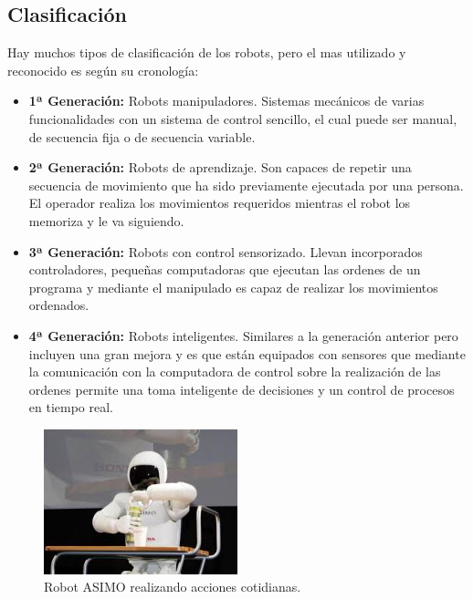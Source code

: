 \subsection{Clasificación}
\hspace{1cm} Hay muchos tipos de clasificación de los robots, pero el mas utilizado y reconocido es según su cronología:

\begin{itemize}
		\item \textbf{1ª Generación:} Robots manipuladores. Sistemas mecánicos de varias funcionalidades con un sistema de control sencillo, el cual puede ser manual, de secuencia fija o de secuencia variable.

	\item\textbf{2ª Generación:} Robots de aprendizaje. Son capaces de repetir una secuencia de movimiento que ha sido previamente ejecutada por una persona. El operador realiza los movimientos requeridos mientras el robot los memoriza y le va siguiendo. 

	\item\textbf{3ª Generación:} Robots con control sensorizado. Llevan incorporados controladores, pequeñas computadoras que ejecutan las ordenes de un programa y mediante el manipulado es capaz de realizar los movimientos ordenados.

	\item\textbf{4ª Generación:} Robots inteligentes. Similares a la generación anterior pero incluyen una gran mejora y es que están equipados con sensores que mediante la comunicación con la computadora de control sobre la realización de las ordenes permite una toma inteligente de decisiones y un control de procesos en tiempo real.
\end{itemize}

\begin{figure}[H]
	\begin{center}
		\includegraphics[width=0.5\textwidth]{imag/IMG11.jpeg}
				\caption{Robot ASIMO realizando acciones cotidianas.} 
	\label{fig:Robot ASIMO.}	
	\end{center}
\end{figure}


